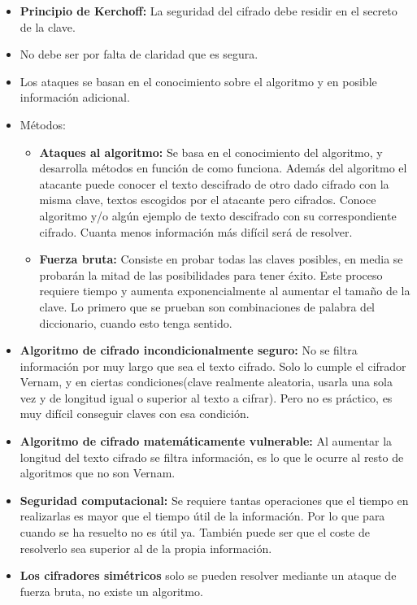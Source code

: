 \documentclass[12pt, twoside, openright]{report} %
\begin{document}
\begin{itemize}
	\item \textbf{Principio de Kerchoff:} La seguridad del cifrado debe residir en el secreto de la clave.
	\item No debe ser por falta de claridad que es segura.
	\item Los ataques se basan en el conocimiento sobre el algoritmo y en posible información adicional.
	\item Métodos:
	      \begin{itemize}
		      \item \textbf{Ataques al algoritmo:} Se basa en el conocimiento del algoritmo, y desarrolla métodos en función de como funciona. Además del algoritmo el atacante puede conocer el texto descifrado de otro dado cifrado con la misma clave, textos escogidos por el atacante pero cifrados. Conoce algoritmo y/o algún ejemplo de texto descifrado con su correspondiente cifrado. Cuanta menos información más difícil será de resolver.
		      \item \textbf{Fuerza bruta:} Consiste en probar todas las claves posibles, en media se probarán la mitad de las posibilidades para tener éxito. Este proceso requiere tiempo y aumenta exponencialmente al aumentar el tamaño de la clave. Lo primero que se prueban son combinaciones de palabra del diccionario, cuando esto tenga sentido.
	      \end{itemize}
	\item \textbf{Algoritmo de cifrado incondicionalmente seguro:} No se filtra información por muy largo que sea el texto cifrado. Solo lo cumple el cifrador Vernam, y en ciertas condiciones(clave realmente aleatoria, usarla una sola vez y de longitud igual o superior al texto a cifrar). Pero no es práctico, es muy difícil conseguir claves con esa condición.
	\item \textbf{Algoritmo de cifrado matemáticamente vulnerable:} Al aumentar la longitud del texto cifrado se filtra información, es lo que le ocurre al resto de algoritmos que no son Vernam.
	\item \textbf{Seguridad computacional:} Se requiere tantas operaciones que el tiempo en realizarlas es mayor que el tiempo útil de la información. Por lo que para cuando se ha resuelto no es útil ya. También puede ser que el coste de resolverlo sea superior al de la propia información.
	\item \textbf{Los cifradores simétricos} solo se pueden resolver mediante un ataque de fuerza bruta, no existe un algoritmo.
\end{itemize}
\end{document}
